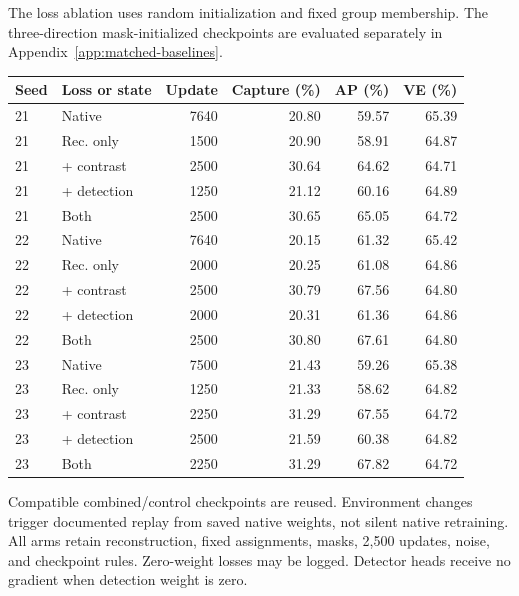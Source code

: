The loss ablation uses random initialization and fixed group membership.
The three-direction mask-initialized checkpoints are evaluated separately in Appendix~\ref{app:matched-baselines}.
\begin{agfresulttable}
\caption{Random-initialized runs and loss-ablation scores on the common test. Scores are percentages, and Update is the selected checkpoint. Rec. only is matched continued Vanilla. Contrast, detection and Both retain reconstruction. Every continued or guided branch consumes 2,500 updates. Selected checkpoints follow the same object-score rule. Final-step scores remain separately recorded.}\label{tab:full}\label{tab:ablationseeds}\label{fig:ablation-summary}\label{tab:selected-updates}
\begin{tabular}{@{}llrrrr@{}}
\toprule
Seed & Loss or state & Update & Capture (\%) & AP (\%) & VE (\%) \\
\midrule
21 & Native & 7640 & 20.80 & 59.57 & 65.39 \\
21 & Rec. only & 1500 & 20.90 & 58.91 & 64.87 \\
21 & + contrast & 2500 & 30.64 & 64.62 & 64.71 \\
21 & + detection & 1250 & 21.12 & 60.16 & 64.89 \\
21 & Both & 2500 & 30.65 & 65.05 & 64.72 \\
22 & Native & 7640 & 20.15 & 61.32 & 65.42 \\
22 & Rec. only & 2000 & 20.25 & 61.08 & 64.86 \\
22 & + contrast & 2500 & 30.79 & 67.56 & 64.80 \\
22 & + detection & 2000 & 20.31 & 61.36 & 64.86 \\
22 & Both & 2500 & 30.80 & 67.61 & 64.80 \\
23 & Native & 7500 & 21.43 & 59.26 & 65.38 \\
23 & Rec. only & 1250 & 21.33 & 58.62 & 64.82 \\
23 & + contrast & 2250 & 31.29 & 67.55 & 64.72 \\
23 & + detection & 2500 & 21.59 & 60.38 & 64.82 \\
23 & Both & 2250 & 31.29 & 67.82 & 64.72 \\
\bottomrule
\end{tabular}

\end{agfresulttable}

Compatible combined/control checkpoints are reused. Environment changes
trigger documented replay from saved native weights, not silent native
retraining. All arms retain reconstruction, fixed assignments, masks, 2,500
updates, noise, and checkpoint rules. Zero-weight losses may be logged.
Detector heads receive no gradient when detection weight is zero.

